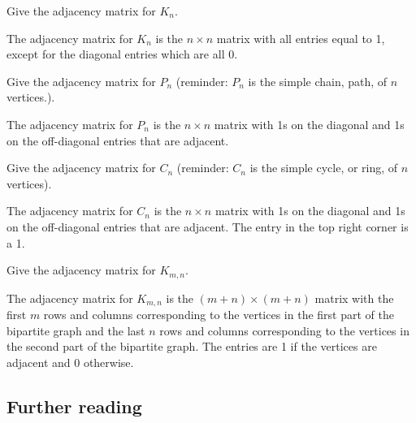 \documentclass[a4paper,10pt]{exam}
\begin{document}
\begin{questions}
\begin{solution}
    \end{solution}
    \question Give the adjacency matrix for $K_n$. 
    \begin{solution}
        The adjacency matrix for $K_n$ is the $n \times n$ matrix with all entries equal to 1, except for the diagonal entries which are all 0.
    \end{solution}
    \question Give the adjacency matrix for $P_n$ (reminder: $P_n$ is the simple chain, path, of $n$ vertices.).
    \begin{solution}
        The adjacency matrix for $P_n$ is the $n \times n$ matrix with 1s on the diagonal and 1s on the off-diagonal entries that are adjacent.
    \end{solution}
    \question Give the adjacency matrix for $C_n$ (reminder: $C_n$ is the simple cycle, or ring, of $n$ vertices).
    \begin{solution}
        The adjacency matrix for $C_n$ is the $n \times n$ matrix with 1s on the diagonal and 1s on the off-diagonal entries that are adjacent. The entry in the top right corner is a 1.
    \end{solution}
    \question Give the adjacency matrix for $K_{m,n}$.
    \begin{solution}
        The adjacency matrix for $K_{m,n}$ is the $(m+n) \times (m+n)$ matrix with the first $m$ rows and columns corresponding to the vertices in the first part of the bipartite graph and the last $n$ rows and columns corresponding to the vertices in the second part of the bipartite graph. The entries are 1 if the vertices are adjacent and 0 otherwise.
    \end{solution}

\end{questions}

\subsection*{Further reading}
\end{document}
